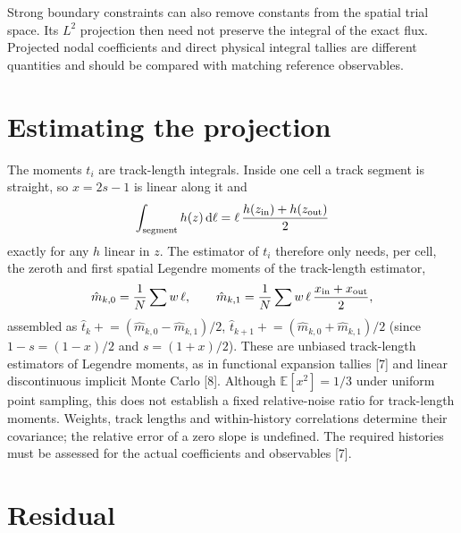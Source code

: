 \documentclass[11pt]{article}
\newcommand{\E}{\mathbb{E}}
\begin{document}
Strong boundary constraints can also remove constants from the spatial trial
space. Its $L^2$ projection then need not preserve the integral of the exact
flux. Projected nodal coefficients and direct physical integral tallies are
different quantities and should be compared with matching reference observables.

\section{Estimating the projection}

The moments $t_i$ are track-length integrals. Inside one cell a track segment is
straight, so $x = 2s-1$ is linear along it and
\begin{equation}
  \int_{\text{segment}} h(z)\,\mathrm{d}\ell = \ell\,\frac{h(z_{\rm in})+h(z_{\rm out})}{2}
\end{equation}
exactly for any $h$ linear in $z$. The estimator of $t_i$ therefore only needs, per
cell, the zeroth and first spatial Legendre moments of the track-length estimator,
\begin{equation}
  \hat m_{k,0} = \frac1N\sum w\,\ell,\qquad
  \hat m_{k,1} = \frac1N\sum w\,\ell\,\frac{x_{\rm in}+x_{\rm out}}{2},
\end{equation}
assembled as $\hat t_k \mathrel{+}= (\hat m_{k,0}-\hat m_{k,1})/2$,
$\hat t_{k+1}\mathrel{+}=(\hat m_{k,0}+\hat m_{k,1})/2$ (since $1-s=(1-x)/2$ and
$s=(1+x)/2$). These are unbiased track-length estimators of Legendre moments, as in
functional expansion tallies [7] and linear discontinuous implicit Monte Carlo [8].
Although $\E[x^2]=1/3$ under uniform point sampling, this does not establish a
fixed relative-noise ratio for track-length moments. Weights, track lengths and
within-history correlations determine their covariance; the relative error of
a zero slope is undefined. The required histories must be assessed for the
actual coefficients and observables [7].

\section{Residual}
\end{document}
